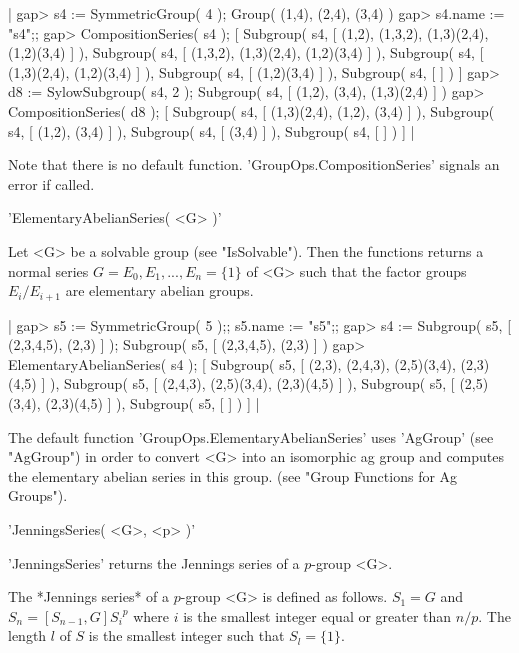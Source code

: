 |    gap> s4 := SymmetricGroup( 4 );
    Group( (1,4), (2,4), (3,4) )
    gap> s4.name := "s4";;
    gap> CompositionSeries( s4 );
    [ Subgroup( s4, [ (1,2), (1,3,2), (1,3)(2,4), (1,2)(3,4) ] ),
      Subgroup( s4, [ (1,3,2), (1,3)(2,4), (1,2)(3,4) ] ),
      Subgroup( s4, [ (1,3)(2,4), (1,2)(3,4) ] ),
      Subgroup( s4, [ (1,2)(3,4) ] ), Subgroup( s4, [  ] ) ]
    gap> d8 := SylowSubgroup( s4, 2 );
    Subgroup( s4, [ (1,2), (3,4), (1,3)(2,4) ] )
    gap> CompositionSeries( d8 );
    [ Subgroup( s4, [ (1,3)(2,4), (1,2), (3,4) ] ),
      Subgroup( s4, [ (1,2), (3,4) ] ), Subgroup( s4, [ (3,4) ] ),
      Subgroup( s4, [  ] ) ] |

Note  that there  is no  default  function.  'GroupOps.CompositionSeries'
signals an error if called.


'ElementaryAbelianSeries( <G> )'

Let <G> be  a solvable  group  (see  "IsSolvable").   Then the  functions
returns a normal series $G = E_0, E_1, ..., E_n = \{1\}$ of <G> such that
the factor groups $E_i / E_{i+1}$ are elementary abelian groups.

|    gap> s5 := SymmetricGroup( 5 );; s5.name := "s5";;
    gap> s4 := Subgroup( s5, [ (2,3,4,5), (2,3) ] );
    Subgroup( s5, [ (2,3,4,5), (2,3) ] )
    gap> ElementaryAbelianSeries( s4 );
    [ Subgroup( s5, [ (2,3), (2,4,3), (2,5)(3,4), (2,3)(4,5) ] ),
      Subgroup( s5, [ (2,4,3), (2,5)(3,4), (2,3)(4,5) ] ),
      Subgroup( s5, [ (2,5)(3,4), (2,3)(4,5) ] ), Subgroup( s5, [  ] ) ] |

The  default  function 'GroupOps.ElementaryAbelianSeries' uses  'AgGroup'
(see "AgGroup") in order to  convert <G> into  an isomorphic ag group and
computes   the  elementary   abelian   series   in   this   group.   (see
"Group Functions for Ag Groups").


'JenningsSeries( <G>, <p> )'

'JenningsSeries' returns the Jennings series of a $p$-group <G>.

The *Jennings series* of  a $p$-group <G> is defined as follows.  $S_1  =
G$ and $S_n  = [ S_{n-1}, G ] {S_i}^p$ where $i$ is the  smallest integer
equal or greater than  $n / p$.  The length  $l$ of  $S$ is  the smallest
integer such  that  $S_l  = \{  1  \}$.

